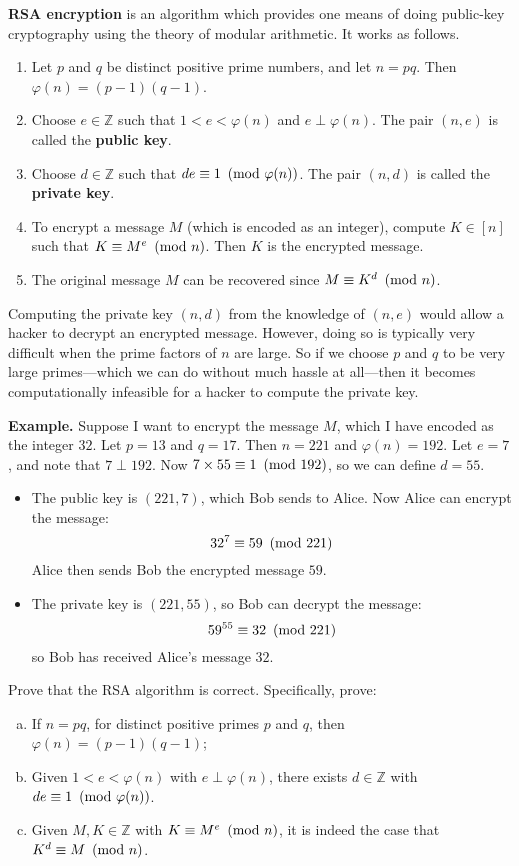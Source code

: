 \textbf{RSA encryption} is an algorithm which provides one means of doing public-key cryptography using the theory of modular arithmetic. It works as follows.
\begin{enumerate}[leftmargin={37.5pt}, label={\textbf{Step \arabic*.}}]
\item Let $p$ and $q$ be distinct positive prime numbers, and let $n = pq$. Then $\varphi(n) = (p-1)(q-1)$.
\item Choose $e \in \mathbb{Z}$ such that $1 < e < \varphi(n)$ and $e \perp \varphi(n)$. The pair $(n,e)$ is called the \textbf{public key}.
\item Choose $d \in \mathbb{Z}$ such that $de \equiv 1 ~\left(\text{mod}~\varphi(n)\right)$. The pair $(n,d)$ is called the \textbf{private key}.
\item To encrypt a message $M$ (which is encoded as an integer), compute $K \in [n]$ such that $K \equiv M^e ~\left(\text{mod}~n\right)$. Then $K$ is the encrypted message.
\item The original message $M$ can be recovered since $M \equiv K^d ~\left(\text{mod}~n\right)$.
\end{enumerate}
Computing the private key $(n,d)$ from the knowledge of $(n,e)$ would allow a hacker to decrypt an encrypted message. However, doing so is typically very difficult when the prime factors of $n$ are large. So if we choose $p$ and $q$ to be very large primes---which we can do without much hassle at all---then it becomes computationally infeasible for a hacker to compute the private key.

\textbf{Example.} Suppose I want to encrypt the message $M$, which I have encoded as the integer $32$. Let $p=13$ and $q=17$. Then $n=221$ and $\varphi(n)=192$. Let $e = 7$, and note that $7 \perp 192$. Now $7 \times 55 \equiv 1 ~\left(\text{mod}~192\right)$, so we can define $d=55$.
\begin{itemize}
\item The public key is $(221,7)$, which Bob sends to Alice. Now Alice can encrypt the message:
\[ 32^7 \equiv 59 ~\left(\text{mod}~221\right) \]
Alice then sends Bob the encrypted message $59$.
\item The private key is $(221, 55)$, so Bob can decrypt the message:
\[ 59^{55} \equiv 32 ~\left(\text{mod}~221\right) \]
so Bob has received Alice's message $32$.
\end{itemize}

\begin{exercise}
Prove that the RSA algorithm is correct. Specifically, prove:
\begin{enumerate}[(a)]
\item If $n=pq$, for distinct positive primes $p$ and $q$, then $\varphi(n) = (p-1)(q-1)$;
\item Given $1<e<\varphi(n)$ with $e \perp \varphi(n)$, there exists $d \in \mathbb{Z}$ with $de \equiv 1 ~\left(\text{mod}~\varphi(n)\right)$.
\item Given $M,K \in \mathbb{Z}$ with $K \equiv M^e ~\left(\text{mod}~n\right)$, it is indeed the case that $K^d \equiv M ~\left(\text{mod}~n\right)$.
\end{enumerate}
\end{exercise}

